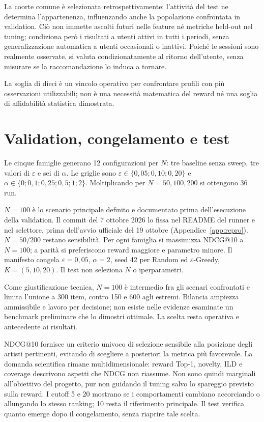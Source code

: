 La coorte comune è selezionata retrospettivamente: l'attività del test ne determina l'appartenenza, influenzando anche la popolazione confrontata in validation. Ciò non immette ascolti futuri nelle feature né metriche held-out nel tuning; condiziona però i risultati a utenti attivi in tutti i periodi, senza generalizzazione automatica a utenti occasionali o inattivi. Poiché le sessioni sono realmente osservate, si valuta condizionatamente al ritorno dell'utente, senza misurare se la raccomandazione lo induca a tornare.

La soglia di dieci è un vincolo operativo per confrontare profili con più osservazioni utilizzabili; non è una necessità matematica del reward né una soglia di affidabilità statistica dimostrata.

\section{Validation, congelamento e test}
Le cinque famiglie generano 12 configurazioni per $N$: tre baseline senza sweep, tre valori di $\varepsilon$ e sei di $\alpha$. Le griglie sono $\varepsilon\in\{0{,}05;0{,}10;0{,}20\}$ e $\alpha\in\{0;0{,}1;0{,}25;0{,}5;1;2\}$. Moltiplicando per $N=50,100,200$ si ottengono 36 run.

$N=100$ è lo scenario principale definito e documentato prima dell'esecuzione della validation. Il commit  del 7 ottobre 2026 lo fissa nel README del runner e nel selettore, prima dell'avvio ufficiale del 19 ottobre (Appendice~\ref{app:repro}). $N=50/200$ restano sensibilità. Per ogni famiglia si massimizza NDCG@10 a $N=100$; a parità si preferiscono reward maggiore e parametro minore. Il manifesto congela $\varepsilon=0{,}05$, $\alpha=2$, seed 42 per Random ed $\varepsilon$-Greedy, $K=(5,10,20)$. Il test non seleziona $N$ o iperparametri.

\par\noindent\begin{minipage}{\linewidth}
Come giustificazione tecnica, $N=100$ è intermedio fra gli scenari confrontati e limita l'unione a 300 item, contro 150 e 600 agli estremi. Bilancia ampiezza ammissibile e lavoro per decisione; non esiste nelle evidenze esaminate un benchmark preliminare che lo dimostri ottimale. La scelta resta operativa e antecedente ai risultati.
\end{minipage}\par

NDCG@10 fornisce un criterio univoco di selezione sensibile alla posizione degli artisti pertinenti, evitando di scegliere a posteriori la metrica più favorevole. La domanda scientifica rimane multidimensionale: reward Top-1, novelty, ILD e coverage descrivono aspetti che NDCG non riassume. Non sono quindi marginali all'obiettivo del progetto, pur non guidando il tuning salvo lo spareggio previsto sulla reward. I cutoff 5 e 20 mostrano se i comportamenti cambiano accorciando o allungando lo stesso ranking; 10 resta il riferimento principale. Il test verifica quanto emerge dopo il congelamento, senza riaprire tale scelta.

